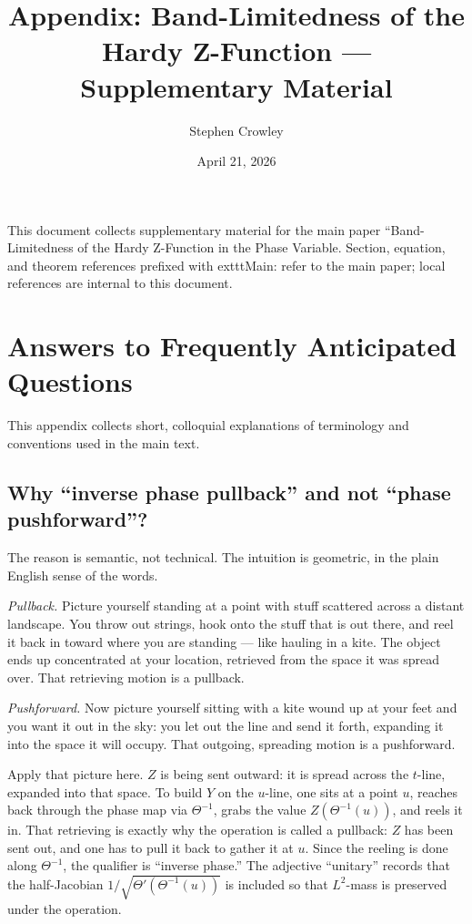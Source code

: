 \documentclass[11pt]{article}
\title{Appendix: Band-Limitedness of the Hardy Z-Function --- Supplementary Material}
\author{Stephen Crowley}
\date{April 21, 2026}
\begin{document}
\maketitle

\noindent This document collects supplementary material for the main paper ``Band-Limitedness of the Hardy Z-Function in the Phase Variable. Section, equation, and theorem references prefixed with 	exttt{Main:} refer to the main paper; local references are internal to this document.

\setcounter{section}{0}
\renewcommand{\thesection}{\Alph{section}}


\section{Answers to Frequently Anticipated Questions}\label{app:FAQ}

This appendix collects short, colloquial explanations of terminology and conventions used in the main text.

\subsection{Why ``inverse phase pullback'' and not ``phase pushforward''?}\label{app:pullback-vs-pushforward}

The reason is semantic, not technical. The intuition is geometric, in the plain English sense of the words.

\emph{Pullback.} Picture yourself standing at a point with stuff scattered across a distant landscape. You throw out strings, hook onto the stuff that is out there, and reel it back in toward where you are standing --- like hauling in a kite. The object ends up concentrated at your location, retrieved from the space it was spread over. That retrieving motion is a pullback.

\emph{Pushforward.} Now picture yourself sitting with a kite wound up at your feet and you want it out in the sky: you let out the line and send it forth, expanding it into the space it will occupy. That outgoing, spreading motion is a pushforward.

Apply that picture here. $Z$ is being sent outward: it is spread across the $t$-line, expanded into that space. To build $Y$ on the $u$-line, one sits at a point $u$, reaches back through the phase map via $\Theta^{-1}$, grabs the value $Z(\Theta^{-1}(u))$, and reels it in. That retrieving is exactly why the operation is called a pullback: $Z$ has been sent out, and one has to pull it back to gather it at $u$. Since the reeling is done along $\Theta^{-1}$, the qualifier is ``inverse phase.'' The adjective ``unitary'' records that the half-Jacobian $1/\sqrt{\Theta'(\Theta^{-1}(u))}$ is included so that $L^2$-mass is preserved under the operation.
\end{document}

